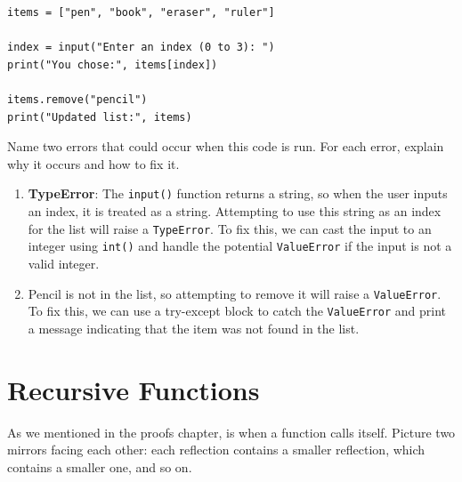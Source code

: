 \begin{Exercise}[label=exceptions1, title=Fix the Code]
\begin{verbatim}
items = ["pen", "book", "eraser", "ruler"]

index = input("Enter an index (0 to 3): ")
print("You chose:", items[index])

items.remove("pencil")
print("Updated list:", items)
\end{verbatim}
Name two errors that could occur when this code is run. For each error, explain why it occurs and how to fix it.
\end{Exercise}
\begin{Answer}[ref=exceptions1]
\begin{enumerate}
    \item \textbf{TypeError}: The \texttt{input()} function returns a string, so when the user inputs an index, it is treated as a string. Attempting to use this string as an index for the list will raise a \texttt{TypeError}. To fix this, we can cast the input to an integer using \texttt{int()} and handle the potential \texttt{ValueError} if the input is not a valid integer.
    \item Pencil is not in the list, so attempting to remove it will raise a \texttt{ValueError}. To fix this, we can use a try-except block to catch the \texttt{ValueError} and print a message indicating that the item was not found in the list.
\end{enumerate}
\end{Answer}

\section{Recursive Functions}
As we mentioned in the proofs chapter,  is when a function calls itself. Picture two mirrors facing each other: each reflection contains a smaller reflection, which contains a smaller one, and so on.

